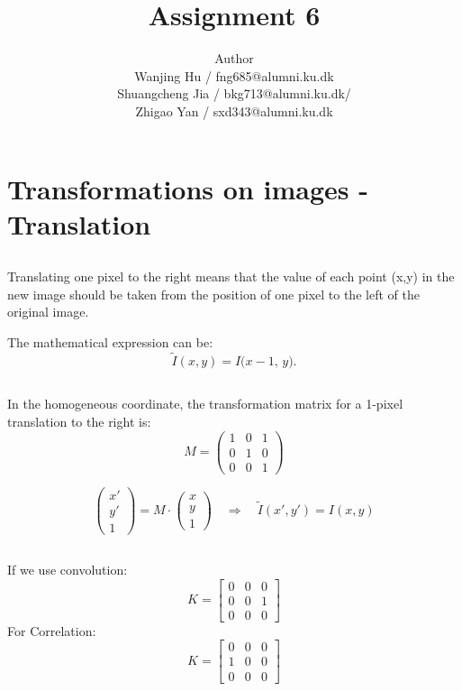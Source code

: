 \documentclass[12pt]{article}
\title{Assignment 6}
\author{Author \\
 Wanjing Hu / fng685@alumni.ku.dk  \\
 Shuangcheng Jia / bkg713@alumni.ku.dk/   \\
 Zhigao Yan / sxd343@alumni.ku.dk  \\
}
\begin{document}
\maketitle

\section{Transformations on images - Translation}
\subsection{}
Translating one pixel to the right means that the value of each point (x,y) in the new image should be taken from the position of one pixel to the left of the original image.

The mathematical expression can be:
 \[
\tilde{I}(x,y) = I\bigl(x - 1,\, y\bigr).
\]
\subsection{}

In the homogeneous coordinate, the transformation matrix for a 1-pixel translation to the right is:
\[
M = 
\begin{pmatrix}
1 & 0 & 1 \\
0 & 1 & 0 \\
0 & 0 & 1
\end{pmatrix}
\]

\[
\begin{pmatrix}
x' \\[6pt]
y' \\[6pt]
1
\end{pmatrix}
=
M
\cdot
\begin{pmatrix}
x \\[6pt]
y \\[6pt]
1
\end{pmatrix}
\quad\Longrightarrow\quad
\tilde{I}(x', y') = I(x, y)
\]
\subsection{}
If we use convolution:
\[
K = 
\begin{bmatrix}
0 & 0 & 0 \\
0 & 0 & 1 \\
0 & 0 & 0
\end{bmatrix}
\]
For Correlation:
\[
K = 
\begin{bmatrix}
0 & 0 & 0 \\
1 & 0 & 0 \\
0 & 0 & 0
\end{bmatrix}
\]
\end{document}
